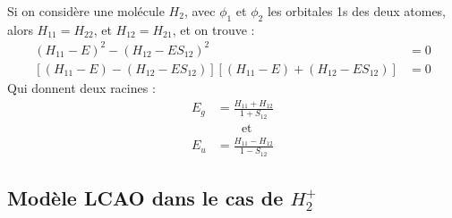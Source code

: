 Si on considère une molécule $H_2$, avec $\phi_1$ et $\phi_2$ les orbitales 1s des deux atomes, alors $H_{11} = H_{22}$, et $H_{12} = H_{21}$, et on trouve :
\begin{equation*}
    \begin{split}
        (H_{11}-E)^2 - (H_{12}-ES_{12})^2 &= 0\\
        [(H_{11}-E) - (H_{12}-ES_{12})][(H_{11}-E) + (H_{12}-ES_{12})] &= 0
    \end{split}
\end{equation*}
Qui donnent deux racines : 
\begin{equation}
    \begin{split}
        E_g &= \frac{H_{11}+H_{12}}{1+S_{12}}\\
        &\quad\quad\textrm{et}\\
        E_u &=\frac{H_{11}-H_{12}}{1-S_{12}}
    \end{split}
\end{equation}

\subsection{Modèle LCAO dans le cas de $H_2^+$}

